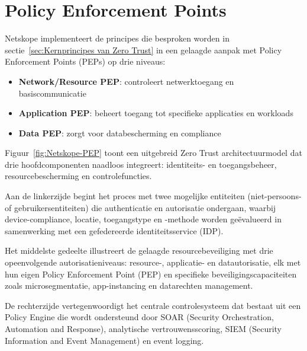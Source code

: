 \section{Policy Enforcement Points}
Netskope implementeert de principes die besproken worden in sectie~\ref{sec:Kernprincipes van Zero Trust} in een gelaagde aanpak met Policy Enforcement Points (PEPs) op drie niveaus:

\begin{itemize}
  \item \textbf{Network/Resource PEP}: controleert netwerktoegang en basiscommunicatie
  \item \textbf{Application PEP}: beheert toegang tot specifieke applicaties en workloads
  \item \textbf{Data PEP}: zorgt voor databescherming en compliance
\end{itemize}

Figuur~\ref{fig:Netskope-PEP} toont een uitgebreid Zero Trust architectuurmodel dat drie hoofdcomponenten naadloos integreert: identiteits- en toegangsbeheer, resourcebescherming en controlefuncties. 

\vspace{2ex}

Aan de linkerzijde begint het proces met twee mogelijke entiteiten (niet-persoons- of gebruikersentiteiten) die authenticatie en autorisatie ondergaan, waarbij device-compliance, locatie, toegangstype en -methode worden geëvalueerd in samenwerking met een gefedereerde identiteitsservice (IDP). 

\vspace{2ex}

Het middelste gedeelte illustreert de gelaagde resourcebeveiliging met drie opeenvolgende autorisatieniveaus: resource-, applicatie- en datautorisatie, elk met hun eigen Policy Enforcement Point (PEP) en specifieke beveiligingscapaciteiten zoals microsegmentatie, app-instancing en datarechten management. 

\vspace{2ex}

De rechterzijde vertegenwoordigt het centrale controlesysteem dat bestaat uit een Policy Engine die wordt ondersteund door SOAR (Security Orchestration, Automation and Response), analytische vertrouwensscoring, SIEM (Security Information and Event Management) en event logging. 

\vspace{2ex}

